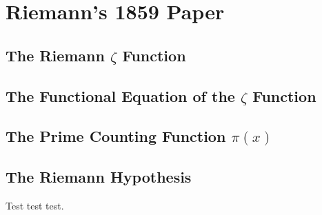 \chapter{Riemann's 1859 Paper}

\section{The Riemann $\zeta$ Function}

\section{The Functional Equation of the $\zeta$ Function}

\section{The Prime Counting Function $\pi(x)$}

\section{The Riemann Hypothesis}

Test test test.